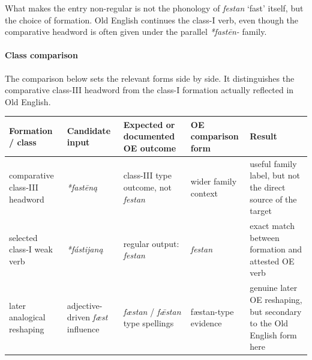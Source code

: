 \documentclass[
  british,
  a4paper,
]{article}
\newcounter{none} %
\begin{document}
What makes the entry non-regular is not the phonology of {\emph{festan}}
`fast' itself, but the choice of formation. Old English continues the
class-I verb, even though the comparative headword is often given under
the parallel {\emph{*fastēn-}} family.

\paragraph{Class comparison}\label{class-comparison}

The comparison below sets the relevant forms side by side. It
distinguishes the comparative class-III headword from the class-I
formation actually reflected in Old English.

{\def\LTcaptype{none} %
\begin{longtable}[]{@{}
  >{\raggedright\arraybackslash}p{}
  >{\raggedright\arraybackslash}p{}
  >{\raggedright\arraybackslash}p{}
  >{\raggedright\arraybackslash}p{}
  >{\raggedright\arraybackslash}p{}@{}}
\toprule\noalign{}
\begin{minipage}[b]{\linewidth}\raggedright
Formation / class
\end{minipage} & \begin{minipage}[b]{\linewidth}\raggedright
Candidate input
\end{minipage} & \begin{minipage}[b]{\linewidth}\raggedright
Expected or documented OE outcome
\end{minipage} & \begin{minipage}[b]{\linewidth}\raggedright
OE comparison form
\end{minipage} & \begin{minipage}[b]{\linewidth}\raggedright
Result
\end{minipage} \\
\midrule\noalign{}
\endhead
\bottomrule\noalign{}
\endlastfoot
comparative class-III headword & {\emph{*fastēną}} & class-III type
outcome, not {\emph{festan}} & wider family context & useful family
label, but not the direct source of the target \\
selected class-I weak verb & {\emph{*fástijaną}} & regular output:
{\emph{festan}} & {\emph{festan}} & exact match between formation and
attested OE verb \\
later analogical reshaping & adjective-driven {\emph{fæst}} influence &
{\emph{fæstan}} / {\emph{fǣstan}} type spellings & fæstan-type evidence
& genuine later OE reshaping, but secondary to the Old English form
here \\
\end{longtable}
}
\end{document}
